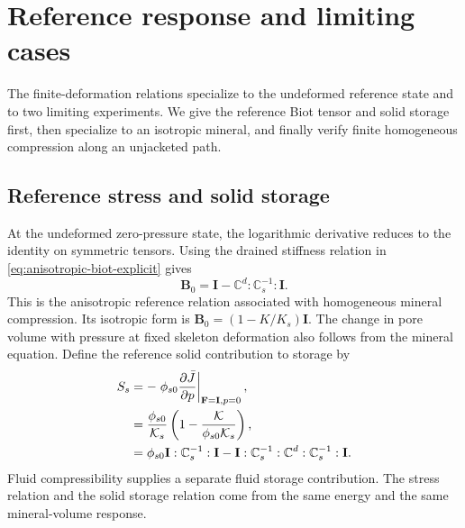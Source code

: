 \section{Reference response and limiting cases}
\label{sec:compatibility}

The finite-deformation relations specialize to the undeformed reference
state and to two limiting experiments. We give the reference Biot tensor
and solid storage first, then specialize to an isotropic mineral, and
finally verify finite homogeneous compression along an unjacketed path.

\subsection{Reference stress and solid storage}
At the undeformed zero-pressure state, the logarithmic derivative reduces
to the identity on symmetric tensors. Using the drained stiffness relation
in \eqref{eq:anisotropic-biot-explicit} gives
\begin{equation}
 \mathbf B_0=\mathbf I-\mathbb{C}^d:\mathbb{C}_s^{-1}:\mathbf I.
 \label{eq:reference-biot-compatibility}
\end{equation}
This is the anisotropic reference relation associated with homogeneous
mineral compression. Its isotropic form is
\(\mathbf B_0=(1-K/K_s)\mathbf I\).
The change in pore volume with pressure at fixed skeleton deformation
also follows from the mineral equation. Define the reference solid
contribution to storage by
\begin{align}
 S_s&=-\left.\phi_{s0}\frac{\partial \bar J}{\partial p}\right|_{\mathbf F=\mathbf I,p=0},
 \label{eq:reference-solid-storage-definition}\\
 &=\frac{\phi_{s0}}{\mathcal{K}_s}\left(1-\frac{\mathcal{K}}{\phi_{s0}\mathcal{K}_s}\right),
 \label{eq:reference-solid-storage}\\
 &=\phi_{s0}\mathbf I:\mathbb{C}_s^{-1}:\mathbf I
 -\mathbf I:\mathbb{C}_s^{-1}:\mathbb{C}^d:\mathbb{C}_s^{-1}:\mathbf I.
 \label{eq:reference-storage-compatibility}
\end{align}
Fluid compressibility supplies a separate fluid storage contribution.
The stress relation and the solid storage relation come from the same energy
and the same mineral-volume response.

